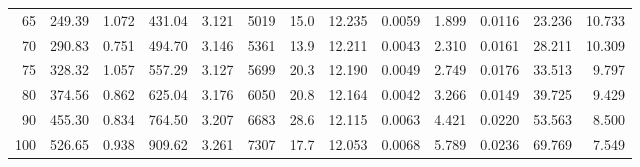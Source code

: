 \documentclass[10pt]{article}
\begin{document}
{\begin{tabular}{|r|rr|rr|rr|rr|rr|r|r|}
       65 &       249.39 &        1.072 &       431.04 &        3.121 &         5019 &         15.0 &       12.235 &       0.0059 &        1.899 &       0.0116 &       23.236 &       10.733 \\
       70 &       290.83 &        0.751 &       494.70 &        3.146 &         5361 &         13.9 &       12.211 &       0.0043 &        2.310 &       0.0161 &       28.211 &       10.309 \\
       75 &       328.32 &        1.057 &       557.29 &        3.127 &         5699 &         20.3 &       12.190 &       0.0049 &        2.749 &       0.0176 &       33.513 &        9.797 \\
       80 &       374.56 &        0.862 &       625.04 &        3.176 &         6050 &         20.8 &       12.164 &       0.0042 &        3.266 &       0.0149 &       39.725 &        9.429 \\
       90 &       455.30 &        0.834 &       764.50 &        3.207 &         6683 &         28.6 &       12.115 &       0.0063 &        4.421 &       0.0220 &       53.563 &        8.500 \\
      100 &       526.65 &        0.938 &       909.62 &        3.261 &         7307 &         17.7 &       12.053 &       0.0068 &        5.789 &       0.0236 &       69.769 &        7.549 \\
\hline
\end{tabular}
}







\pagebreak
\end{document}
